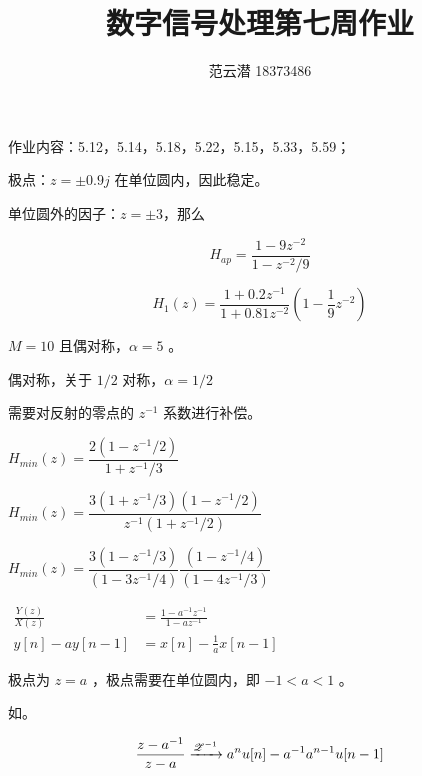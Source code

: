 \documentclass[lang=cn,11pt,a4paper,cite=authoryear,twocolumn]{elegantpaper}
\title{数字信号处理\quad 第七周作业}
\author{范云潜 18373486}
\institute{微电子学院 184111 班}
\date{\zhtoday}
\begin{document}
\maketitle

作业内容：5.12，5.14，5.18，5.22，5.15，5.33，5.59；




极点：\(z=\pm 0.9 j\) 在单位圆内，因此稳定。


单位圆外的因子：\(z=\pm 3\)，那么

\[H_{ap} = \frac{1-9z^{-2}}{1-z^{-2}/9}\]

\[H_1(z) = \frac{1+0.2z^{-1}}{1+0.81z^{-2}} (1-\frac{1}{9}z^{-2})\]



 \(M=10\) 且偶对称，\(\alpha = 5\) 。

 偶对称，关于 \(1/2\) 对称，\(\alpha = 1/2\)


需要对反射的零点的 \(z^{-1}\) 系数进行补偿。


\(H_{min}(z) = \dfrac{2(1-z^{-1}/2)}{1 + z^{-1}/3}\)


\(H_{min}(z) = \dfrac{3(1+z^{-1}/3)(1-z^{-1}/2)}{z^{-1}(1+z^{-1}/2)}\)


\(H_{min}(z) = \dfrac{3(1-z^{-1}/3)}{(1-3z^{-1}/4)}\dfrac{(1-z^{-1}/4)}{(1-4z^{-1}/3)}\)



\(\begin{aligned}
    \frac{Y(z)}{X(z)} &= \frac{1-a^{-1}z^{-1}}{1-az^{-1}} \\
    y[n] - ay[n-1] &= x[n] - \frac{1}{a} x[n-1]
\end{aligned}\)



极点为 \(z = a\) ，极点需要在单位圆内，即 \(-1 < a < 1\) 。


如。



\[\frac{z-a^{-1}}{z-a} \xrightarrow{\mathscr{Z}^{-1}} a^nu[n] - a^{-1}a^{n-1}u[n-1]\]
\end{document}
